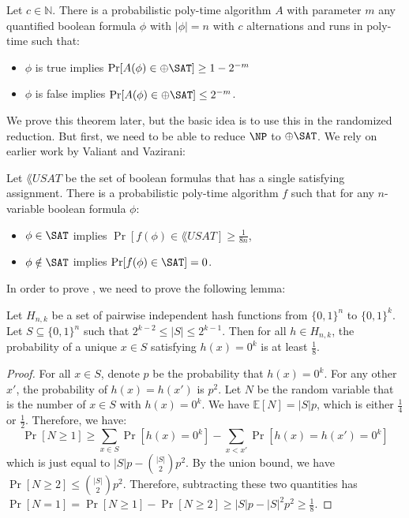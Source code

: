 \begin{theorem}
\label{thm:parity_sat_randomized_reduction}
Let $c \in \mathbb{N}$. There is a probabilistic poly-time algorithm $A$ with parameter $m$ any quantified boolean formula $\phi$ with $|\phi| = n$ with $c$ alternations and runs in poly-time such that:
\begin{itemize}
\item $\phi$ is true implies $\Pr[A(\phi) \in \ParitySAT] \ge 1-2^{-m}$
\item $\phi$ is false implies $\Pr[A(\phi) \in \ParitySAT] \le 2^{-m}$.
\end{itemize}
\end{theorem}
We prove this theorem later, but the basic idea is to use this in the randomized reduction. But first, we need to be able to reduce $\NP$ to $\ParitySAT$. We rely on earlier work by Valiant and Vazirani:
\newcommand{\USAT}{\lang{USAT}}
\begin{theorem}
\label{thm:valiant_vazirani}
Let $\USAT$ be the set of boolean formulas that has a single satisfying assignment. There is a probabilistic poly-time algorithm $f$ such that for any $n$-variable boolean formula $\phi$:
\begin{itemize}
\item $\phi \in \SAT$ implies $\Pr[f(\phi) \in \USAT] \ge \frac{1}{8n}$,
\item $\phi \notin \SAT$ implies $\Pr[f(\phi) \in \SAT] = 0$.
\end{itemize}
\end{theorem}
In order to prove , we need to prove the following lemma:
\begin{lemma}
Let $H_{n,k}$ be a set of pairwise independent hash functions from $\{0,1\}^n$ to $\{0,1\}^k$. Let $S \subseteq \{0, 1\}^n$ such that $2^{k-2} \le |S| \le 2^{k-1}$. Then for all $h \in H_{n, k}$, the probability of a unique $x \in S$ satisfying $h(x) = 0^k$ is at least $\frac{1}{8}$.
\end{lemma}
\begin{proof}
For all $x \in S$, denote $p$ be the probability that $h(x) = 0^k$. For any other $x'$, the probability of $h(x) = h(x')$ is $p^2$. Let $N$ be the random variable that is the number of $x \in S$ with $h(x) = 0^k$. We have $\mathbb{E}[N] = |S|p$, which is either $\frac{1}{4}$ or $\frac{1}{2}$. Therefore, we have:
\[
\Pr[N \ge 1] \ge \sum_{x \in S} \Pr[h(x) = 0^k] - \sum_{x < x'} \Pr[h(x) = h(x') = 0^k]
\]
which is just equal to $|S|p - {|S| \choose 2}p^2$. By the union bound, we have $\Pr[N \ge 2] \le {|S| \choose 2}p^2$. Therefore, subtracting these two quantities has $\Pr[N=1] = \Pr[N \ge 1] - \Pr[N \ge 2] \ge |S|p - |S|^2p^2 \ge \frac{1}{8}$.
\end{proof}
